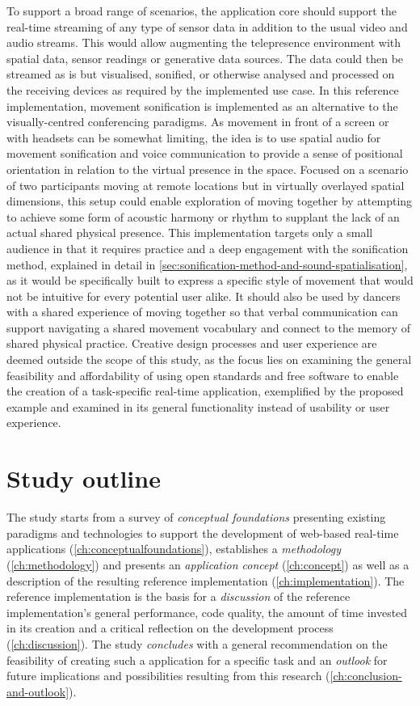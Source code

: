 To support a broad range of scenarios, the application core should support the real-time streaming of any type of sensor data in addition to the usual video and audio streams.
This would allow augmenting the telepresence environment with spatial data, sensor readings or generative data sources.
The data could then be streamed as is but visualised, sonified, or otherwise analysed and processed on the receiving devices as required by the implemented use case.
In this reference implementation, movement sonification is implemented as an alternative to the visually-centred conferencing paradigms.
As movement in front of a screen or with headsets can be somewhat limiting, the idea is to use spatial audio for movement sonification and voice communication to provide a sense of positional orientation in relation to the virtual presence in the space.
Focused on a scenario of two participants moving at remote locations but in virtually overlayed spatial dimensions, this setup could enable exploration of moving together by attempting to achieve some form of acoustic harmony or rhythm to supplant the lack of an actual shared physical presence.
This implementation targets only a small audience in that it requires practice and a deep engagement with the sonification method, explained in detail in \autoref{sec:sonification-method-and-sound-spatialisation}, as it would be specifically built to express a specific style of movement that would not be intuitive for every potential user alike.
It should also be used by dancers with a shared experience of moving together so that verbal communication can support navigating a shared movement vocabulary and connect to the memory of shared physical practice.
Creative design processes and user experience are deemed outside the scope of this study, as the focus lies on examining the general feasibility and affordability of using open standards and free software to enable the creation of a task-specific real-time application, exemplified by the proposed example and examined in its general functionality instead of usability or user experience.

\section{Study outline}
\label{sec:outline}

The study starts from a survey of \emph{conceptual foundations} presenting existing paradigms and technologies to support the development of web-based real-time applications (\autoref{ch:conceptualfoundations}), establishes a \emph{methodology} (\autoref{ch:methodology}) and presents an \emph{application concept} (\autoref{ch:concept}) as well as a description of the resulting {reference implementation} (\autoref{ch:implementation}).
The reference implementation is the basis for a \emph{discussion} of the reference implementation's general performance, code quality, the amount of time invested in its creation and a critical reflection on the development process (\autoref{ch:discussion}).
The study \emph{concludes} with a general recommendation on the feasibility of creating such a  application for a specific task and an \emph{outlook} for future implications and possibilities resulting from this research (\autoref{ch:conclusion-and-outlook}).

